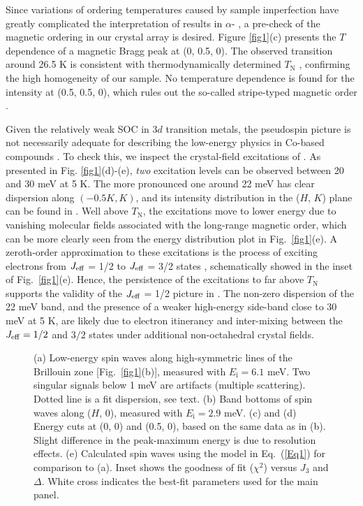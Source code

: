 \documentclass[%
reprint,
superscriptaddress,
amsmath,amssymb,
aps,
prb,
]{revtex4-2}
\begin{document}
Since variations of ordering temperatures caused by sample imperfection have greatly complicated the interpretation of results in $\alpha$- \cite{BanerjeeNM2016,CaoPRB2016}, a pre-check of the magnetic ordering in our  crystal array is desired. Figure \ref{fig1}(c) presents the $T$ dependence of a magnetic Bragg peak at (0, 0.5, 0). The observed transition around 26.5 K is consistent with thermodynamically determined $T_\mathrm{N}$ \cite{BeraPRB2017,XiaoCGD2019}, confirming the high homogeneity of our sample. No temperature dependence is found for the intensity at (0.5, 0.5, 0), which rules out the so-called stripe-typed magnetic order \cite{ChoiPRL2012}.
	
Given the relatively weak SOC in 3$d$ transition metals, the pseudospin picture is not necessarily adequate for describing the low-energy physics in Co-based compounds \cite{KimPRB2020,KimJPCM2021_2}. To check this, we inspect the crystal-field excitations of . As presented in Fig. \ref{fig1}(d)-(e), \textit{two} excitation levels can be observed between 20 and 30 meV at 5 K. The more pronounced one around 22 meV has clear dispersion along $(-0.5 K, K)$, and its intensity distribution in the ($H$, $K$) plane can be found in \cite{SM}. Well above $T_\mathrm{N}$, the excitations move to lower energy due to vanishing molecular fields associated with the long-range magnetic order, which can be more clearly seen from the energy distribution plot in Fig.~\ref{fig1}(e). A zeroth-order approximation to these excitations is the process of exciting electrons from $J_{\rm{eff}}$ = 1/2 to $J_{\rm{eff}}$ = 3/2 states \cite{SongvilayPRB2020,KimPRB2020,KimJPCM2021_2}, schematically showed in the inset of Fig.~\ref{fig1}(e). Hence, the persistence of the excitations to far above $T_\mathrm{N}$ supports the validity of the $J_{\rm{eff}}$ = 1/2 picture in . The non-zero dispersion of the 22 meV band, and the presence of a weaker high-energy side-band close to 30 meV at 5 K, are likely due to electron itinerancy and inter-mixing between the $J_{\rm{eff}} = 1/2$ and $3/2$ states \cite{BuyersJPC1971} under additional non-octahedral crystal fields.

\begin{figure}[t!]
\caption{(a) Low-energy spin waves along high-symmetric lines of the Brillouin zone [Fig.~\ref{fig1}(b)], measured with $E_\mathrm{i} = 6.1$ meV. Two singular signals below 1 meV are artifacts (multiple scattering). Dotted line is a fit dispersion, see text. (b) Band bottoms of spin waves along ($H$, 0), measured with $E_\mathrm{i} = 2.9$ meV. (c) and (d) Energy cuts at (0, 0) and (0.5, 0), based on the same data as in (b). Slight difference in the peak-maximum energy is due to resolution effects. (e) Calculated spin waves using the model in Eq.~(\ref{Eq1}) for comparison to (a). Inset shows the goodness of fit ($\chi^2$) versus $J_3$ and $\Delta$. White cross indicates the best-fit parameters used for the main panel.}
\label{fig2}
\end{figure}
\end{document}
